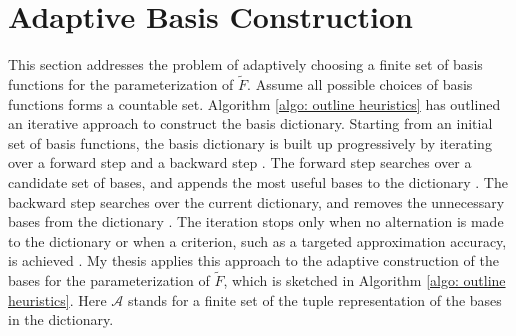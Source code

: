 \section{Adaptive Basis Construction}
\label{sec: adaptive basis}
This section addresses the problem of adaptively choosing a finite set of basis functions
for the parameterization of $\tilde{F}$.
Assume all possible choices of basis functions forms a countable set.
Algorithm \ref{algo: outline heuristics} has outlined an iterative approach 
to construct the basis dictionary.
Starting from an initial set of basis functions,
the basis dictionary is built up progressively 
by iterating over a forward step and a backward step
\cite{adaptive basis 1, adaptive basis 2, adaptive basis 3}.
The forward step searches over a candidate set of bases, and appends the most useful bases 
to the dictionary
\cite{adaptive basis 1, adaptive basis 2, adaptive basis 3}.
The backward step searches over the current dictionary, and removes the 
unnecessary bases from the dictionary
\cite{adaptive basis 1, adaptive basis 2, adaptive basis 3}.
The iteration stops only when no alternation is made to the dictionary or when a criterion, such
as a targeted approximation accuracy,
is achieved \cite{adaptive basis 1, adaptive basis 2, adaptive basis 3}. My thesis applies 
this approach to the adaptive construction of the bases for the parameterization of $\tilde{F}$,
which is sketched in Algorithm \ref{algo: outline heuristics}. Here
$\mathcal{A}$ stands for a finite set of the tuple representation of the bases in the
dictionary.\\

